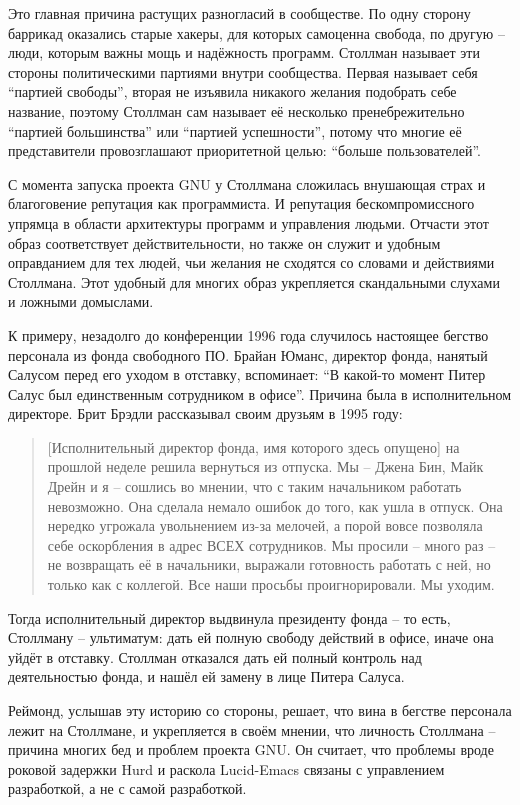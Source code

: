 Это главная причина растущих разногласий в сообществе. По одну сторону баррикад оказались старые хакеры, для которых самоценна свобода, по другую -- люди, которым важны мощь и надёжность программ. Столлман называет эти стороны политическими партиями внутри сообщества. Первая называет себя ``партией свободы'', вторая не изъявила никакого желания подобрать себе название, поэтому Столлман сам называет её несколько пренебрежительно ``партией большинства'' или ``партией успешности'', потому что многие её представители провозглашают приоритетной целью: ``больше пользователей''.

С момента запуска проекта GNU у Столлмана сложилась внушающая страх и благоговение репутация как программиста. И репутация бескомпромиссного упрямца в области архитектуры программ и управления людьми. Отчасти этот образ соответствует действительности, но также он служит и удобным оправданием для тех людей, чьи желания не сходятся со словами и действиями Столлмана. Этот удобный для многих образ укрепляется скандальными слухами и ложными домыслами.

К примеру, незадолго до конференции 1996 года случилось настоящее бегство персонала из фонда свободного ПО. Брайан Юманс, директор фонда, нанятый Салусом перед его уходом в отставку, вспоминает: ``В какой-то момент Питер Салус был единственным сотрудником в офисе''. Причина была в исполнительном директоре. Брит Брэдли рассказывал своим друзьям в 1995 году:

\begin{quote}
[Исполнительный директор фонда, имя которого здесь опущено] на прошлой неделе решила вернуться из отпуска. Мы -- Джена Бин, Майк Дрейн и я -- сошлись во мнении, что с таким начальником работать невозможно. Она сделала немало ошибок до того, как ушла в отпуск. Она нередко угрожала увольнением из-за мелочей, а порой вовсе позволяла себе оскорбления в адрес ВСЕХ сотрудников. Мы просили -- много раз -- не возвращать её в начальники, выражали готовность работать с ней, но только как с коллегой. Все наши просьбы проигнорировали. Мы уходим.
\end{quote}

Тогда исполнительный директор выдвинула президенту фонда -- то есть, Столлману -- ультиматум: дать ей полную свободу действий в офисе, иначе она уйдёт в отставку. Столлман отказался дать ей полный контроль над деятельностью фонда, и нашёл ей замену в лице Питера Салуса.

Реймонд, услышав эту историю со стороны, решает, что вина в бегстве персонала лежит на Столлмане, и укрепляется в своём мнении, что личность Столлмана -- причина многих бед и проблем проекта GNU. Он считает, что проблемы вроде роковой задержки Hurd и раскола Lucid-Emacs связаны с управлением разработкой, а не с самой разработкой.

